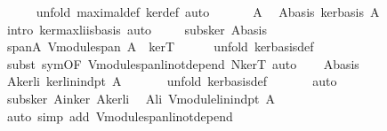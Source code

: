 \begin{isabellebody}
\ \ \ \ \isamarkupfalse%
\ {\isacharparenleft}unfold\ maximal{\isacharunderscore}def\ ker{\isacharunderscore}def{\isacharcomma}\ auto{\isacharparenright}\isanewline
\ \ %
\isanewline
\ \ \isamarkupfalse%
\ A\ \isamarkupfalse%
\ Abasis{\isacharcolon}\ {\isachardoublequoteopen}ker{\isachardot}basis\ A{\isachardoublequoteclose}\ \isanewline
\ \ \ \ \isamarkupfalse%
\ {\isacharparenleft}intro\ ker{\isachardot}max{\isacharunderscore}li{\isacharunderscore}is{\isacharunderscore}basis{\isacharcomma}\ auto{\isacharparenright}\ \isanewline
\ \ \isamarkupfalse%
\ subs{\isacharunderscore}ker\ Abasis\ \isamarkupfalse%
\ spanA{\isacharcolon}\ {\isachardoublequoteopen}V{\isachardot}module{\isachardot}span\ A\ {\isacharequal}\ kerT{\isachardoublequoteclose}\isanewline
\ \ \ \ \isamarkupfalse%
\ {\isacharparenleft}unfold\ ker{\isachardot}basis{\isacharunderscore}def{\isacharparenright}\isanewline
\ \ \ \ \isamarkupfalse%
\ {\isacharparenleft}subst\ sym{\isacharbrackleft}OF\ V{\isachardot}module{\isachardot}span{\isacharunderscore}li{\isacharunderscore}not{\isacharunderscore}depend{\isacharparenleft}{}{\isacharparenright}{\isacharbrackleft}\ {\isacharquery}N{\isacharequal}{\isachardoublequoteopen}kerT{\isachardoublequoteclose}{\isacharbrackright}{\isacharbrackright}{\isacharcomma}\ auto{\isacharparenright}\isanewline
\ \ \isamarkupfalse%
\ Abasis\ \isamarkupfalse%
\ Akerli{\isacharcolon}\ {\isachardoublequoteopen}ker{\isachardot}lin{\isacharunderscore}indpt\ A{\isachardoublequoteclose}\ \isanewline
\ \ \ \ \isamarkupfalse%
\ {\isacharparenleft}unfold\ ker{\isachardot}basis{\isacharunderscore}def{\isacharparenright}\ \isanewline
\ \ \ \ \isamarkupfalse%
\ auto\isanewline
\ \ \isamarkupfalse%
\ subs{\isacharunderscore}ker\ Ainker\ Akerli\ \isamarkupfalse%
\ Ali{\isacharcolon}\ {\isachardoublequoteopen}V{\isachardot}module{\isachardot}lin{\isacharunderscore}indpt\ A{\isachardoublequoteclose}\ \isanewline
\ \ \ \ \isamarkupfalse%
\ {\isacharparenleft}auto\ simp\ add{\isacharcolon}\ V{\isachardot}module{\isachardot}span{\isacharunderscore}li{\isacharunderscore}not{\isacharunderscore}depend{\isacharparenleft}{}{\isacharparenright}{\isacharparenright}%
\begin{isamarkuptxt}%

\end{isamarkuptxt}
\end{isabellebody}

